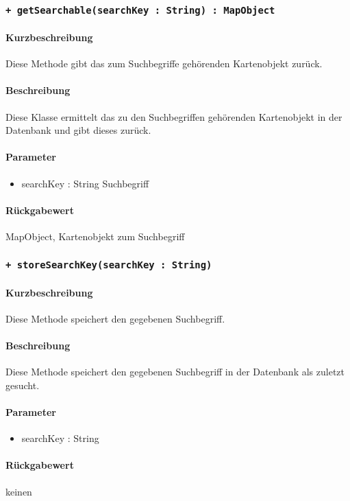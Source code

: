 \subsubsection{\texttt{+ getSearchable(searchKey : String) : MapObject}}%
\paragraph*{Kurzbeschreibung}
Diese Methode gibt das zum Suchbegriffe gehörenden Kartenobjekt zurück.
\paragraph*{Beschreibung}
Diese Klasse ermittelt das zu den Suchbegriffen gehörenden Kartenobjekt in der Datenbank und gibt dieses zurück.
\paragraph*{Parameter}
\begin{itemize}
    \item searchKey : String Suchbegriff
\end{itemize}
\paragraph*{Rückgabewert}
MapObject, Kartenobjekt zum Suchbegriff

\subsubsection{\texttt{+ storeSearchKey(searchKey : String)}}%
\paragraph*{Kurzbeschreibung}
Diese Methode speichert den gegebenen Suchbegriff.
\paragraph*{Beschreibung}
Diese Methode speichert den gegebenen Suchbegriff in der Datenbank als zuletzt gesucht.
\paragraph*{Parameter}
\begin{itemize}
    \item searchKey : String
\end{itemize}
\paragraph*{Rückgabewert}
keinen

